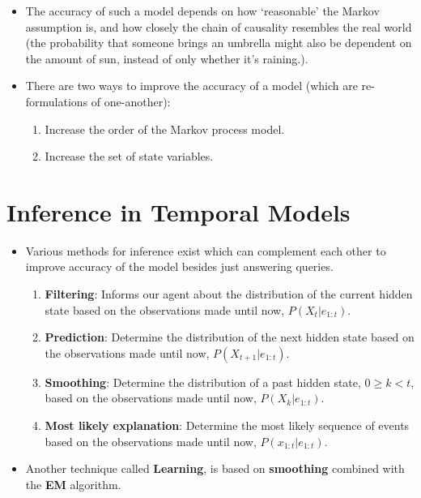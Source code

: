 \documentclass[
]{book}
\providecommand{\tightlist}{%
  \setlength{\itemsep}{0pt}\setlength{\parskip}{0pt}}
\begin{document}
\begin{itemize}
\tightlist
\item
  The accuracy of such a model depends on how `reasonable' the Markov
  assumption is, and how closely the chain of causality resembles the
  real world (the probability that someone brings an umbrella might also
  be dependent on the amount of sun, instead of only whether it's
  raining.).
\item
  There are two ways to improve the accuracy of a model (which are
  re-formulations of one-another):

  \begin{enumerate}
  \def\labelenumi{\arabic{enumi}.}
  \tightlist
  \item
    Increase the order of the Markov process model.
  \item
    Increase the set of state variables.
  \end{enumerate}
\end{itemize}

\hypertarget{inference-in-temporal-models}{%
\section{Inference in Temporal
Models}\label{inference-in-temporal-models}}

\begin{itemize}
\tightlist
\item
  Various methods for inference exist which can complement each other to
  improve accuracy of the model besides just answering queries.

  \begin{enumerate}
  \def\labelenumi{\arabic{enumi}.}
  \tightlist
  \item
    \textbf{Filtering}: Informs our agent about the distribution of the
    current hidden state based on the observations made until now,
    \(P(X_t|e_{1:t})\).
  \item
    \textbf{Prediction}: Determine the distribution of the next hidden
    state based on the observations made until now,
    \(P(X_{t+1}|e_{1:t})\).
  \item
    \textbf{Smoothing}: Determine the distribution of a past hidden
    state, \(0 \ge k \lt t\), based on the observations made until now,
    \(P(X_k|e_{1:t})\).
  \item
    \textbf{Most likely explanation}: Determine the most likely sequence
    of events based on the observations made until now,
    \(P(x_{1:t}|e_{1:t})\).
  \end{enumerate}
\item
  Another technique called \textbf{Learning}, is based on
  \textbf{smoothing} combined with the \textbf{EM} algorithm.
\end{itemize}
\end{document}
